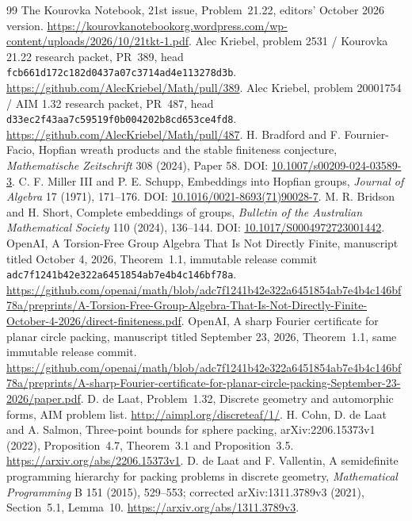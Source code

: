 \documentclass[11pt]{article}
\begin{document}
\begin{thebibliography}{99}
 The Kourovka Notebook, 21st issue, Problem~21.22, editors' October 2026 version. \url{https://kourovkanotebookorg.wordpress.com/wp-content/uploads/2026/10/21tkt-1.pdf}.
 Alec Kriebel, problem 2531 / Kourovka 21.22 research packet, PR~389, head \nolinkurl{fcb661d172c182d0437a07c3714ad4e113278d3b}. \url{https://github.com/AlecKriebel/Math/pull/389}.
 Alec Kriebel, problem 20001754 / AIM 1.32 research packet, PR~487, head \nolinkurl{d33ec2f43aa7c59519f0b004202b8cd653ce4fd8}. \url{https://github.com/AlecKriebel/Math/pull/487}.
 H. Bradford and F. Fournier-Facio, Hopfian wreath products and the stable finiteness conjecture, \emph{Mathematische Zeitschrift} 308 (2024), Paper 58. DOI: \href{https://doi.org/10.1007/s00209-024-03589-3}{10.1007/s00209-024-03589-3}.
 C. F. Miller III and P. E. Schupp, Embeddings into Hopfian groups, \emph{Journal of Algebra} 17 (1971), 171--176. DOI: \href{https://doi.org/10.1016/0021-8693(71)90028-7}{10.1016/0021-8693(71)90028-7}.
 M. R. Bridson and H. Short, Complete embeddings of groups, \emph{Bulletin of the Australian Mathematical Society} 110 (2024), 136--144. DOI: \href{https://doi.org/10.1017/S0004972723001442}{10.1017/S0004972723001442}.
 OpenAI, A Torsion-Free Group Algebra That Is Not Directly Finite, manuscript titled October 4, 2026, Theorem~1.1, immutable release commit \nolinkurl{adc7f1241b42e322a6451854ab7e4b4c146bf78a}. \url{https://github.com/openai/math/blob/adc7f1241b42e322a6451854ab7e4b4c146bf78a/preprints/A-Torsion-Free-Group-Algebra-That-Is-Not-Directly-Finite-October-4-2026/direct-finiteness.pdf}.
 OpenAI, A sharp Fourier certificate for planar circle packing, manuscript titled September 23, 2026, Theorem~1.1, same immutable release commit. \url{https://github.com/openai/math/blob/adc7f1241b42e322a6451854ab7e4b4c146bf78a/preprints/A-sharp-Fourier-certificate-for-planar-circle-packing-September-23-2026/paper.pdf}.
 D. de Laat, Problem~1.32, Discrete geometry and automorphic forms, AIM problem list. \url{http://aimpl.org/discreteaf/1/}.
 H. Cohn, D. de Laat and A. Salmon, Three-point bounds for sphere packing, arXiv:2206.15373v1 (2022), Proposition~4.7, Theorem~3.1 and Proposition~3.5. \url{https://arxiv.org/abs/2206.15373v1}.
 D. de Laat and F. Vallentin, A semidefinite programming hierarchy for packing problems in discrete geometry, \emph{Mathematical Programming} B 151 (2015), 529--553; corrected arXiv:1311.3789v3 (2021), Section~5.1, Lemma~10. \url{https://arxiv.org/abs/1311.3789v3}.

\end{thebibliography}
\end{document}
